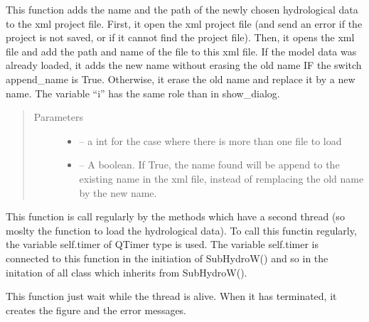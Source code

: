 \documentclass[letterpaper,10pt,english]{sphinxmanual}
\begin{document}
\begin{fulllineitems}
\begin{fulllineitems}
This function adds the name and the path of the newly chosen hydrological data to the xml project file. First,
it open the xml project file (and send an error if the project is not saved, or if it cannot find the project
file). Then, it opens the xml file and add the path and name of the file to this xml file. If the model data was
already loaded, it adds the new name without erasing the old name IF the switch append\_name is True. Otherwise,
it erase the old name and replace it by a new name. The variable “i” has the same role than in show\_dialog.
\begin{quote}\begin{description}
\item[{Parameters}] \leavevmode\begin{itemize}
\item {} 
 -- a int for the case where there is more than one file to load

\item {} 
 -- A boolean. If True, the name found will be append to the existing name in the xml file,
instead of remplacing the old name by the new name.

\end{itemize}

\end{description}\end{quote}

\end{fulllineitems}


\begin{fulllineitems}
\label{\detokenize{index:src_GUI.hydro_GUI_2.SubHydroW.send_data}}
This function is call regularly by the methods which have a second thread (so moslty the function
to load the hydrological data). To call this functin regularly, the variable self.timer of QTimer type is used.
The variable self.timer is connected to this function in the initiation of SubHydroW() and so in the initation
of all class which inherits from SubHydroW().

This function just wait while the thread is alive. When it has terminated, it creates the figure and the error
messages.

\end{fulllineitems}



\end{fulllineitems}
\end{document}
